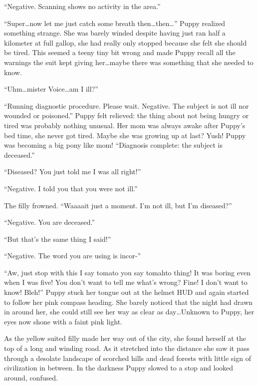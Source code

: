 ``{\mt Negative. Scanning shows no activity in the area.}''

``Super\dots now let me just catch some breath then\dots then\dots'' Puppy realized something strange. She was barely winded despite having just ran half a kilometer at full gallop, she had really only stopped because she felt she should be tired. This seemed a teeny tiny bit wrong and made Puppy recall all the warnings the suit kept giving her\dots maybe there was something that she needed to know.

``Uhm\dots mister Voice\dots am I ill?''

``{\mt Running diagnostic procedure. Please wait. Negative. The subject is not ill nor wounded or poisoned.'' Puppy felt relieved: the thing about not being hungry or tired was probably nothing unusual. Her mom was always awake after Puppy's bed time, she never got tired. Maybe she was growing up at last? Yush! Puppy was becoming a big pony like mom! ``Diagnosis complete: the subject is deceased.}''

``Diseased? You just told me I was all right!''

``{\mt Negative. I told you that you were not ill.}''

The filly frowned. ``Waaaait just a moment. I'm not ill, but I'm diseased?''

``{\mt Negative. You are deceased.}''

``But that's the same thing I said!''

``{\mt Negative. The word you are using is incor-}''

``Aw, just stop with this I say tomato you say tomahto thing! It was boring even when I was five! You don't want to tell me what's wrong? Fine! I don't want to know! Bleh!'' Puppy stuck her tongue out at the helmet HUD and again started to follow her pink compass heading. She barely noticed that the night had drawn in around her, she could still see her way as clear as day\dots Unknown to Puppy, her eyes now shone with a faint pink light.

\horizonline


As the yellow suited filly made her way out of the city, she found herself at the top of a long and winding road. As it stretched into the distance she saw it pass through a desolate landscape of scorched hills and dead forests with little sign of civilization in between. In the darkness Puppy slowed to a stop and looked around, confused.

